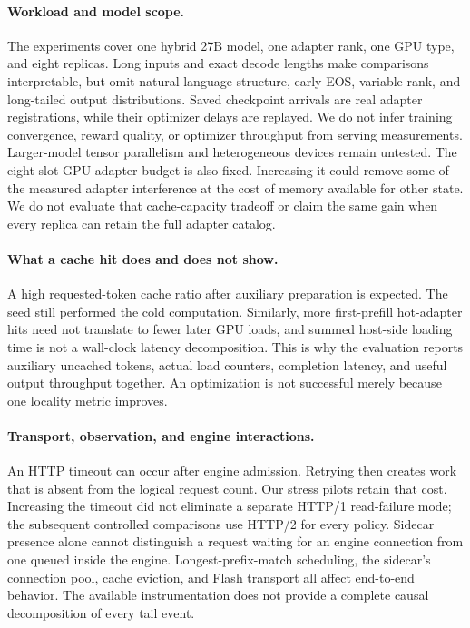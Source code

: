 \paragraph{Workload and model scope.}
The experiments cover one hybrid 27B model, one adapter rank, one GPU type, and
eight replicas. Long inputs and exact decode lengths make comparisons
interpretable, but omit natural language structure, early EOS, variable rank,
and long-tailed output distributions. Saved checkpoint arrivals are real adapter
registrations, while their optimizer delays are replayed. We do not infer
training convergence, reward quality, or optimizer throughput from serving
measurements. Larger-model tensor parallelism and heterogeneous devices remain
untested.
The eight-slot GPU adapter budget is also fixed. Increasing it could remove
some of the measured adapter interference at the cost of memory available for
other state. We do not evaluate that cache-capacity tradeoff or claim the same
gain when every replica can retain the full adapter catalog.

\paragraph{What a cache hit does and does not show.}
A high requested-token cache ratio after auxiliary preparation is expected.
The seed still performed the cold computation. Similarly, more first-prefill
hot-adapter hits need not translate to fewer later GPU loads, and summed
host-side loading time is not a wall-clock latency decomposition. This is why
the evaluation reports auxiliary uncached tokens, actual load counters,
completion latency, and useful output throughput together. An optimization is
not successful merely because one locality metric improves.

\paragraph{Transport, observation, and engine interactions.}
An HTTP timeout can occur after engine admission. Retrying then creates work
that is absent from the logical request count. Our stress pilots retain that
cost. Increasing the timeout did not eliminate a separate HTTP/1 read-failure
mode; the subsequent controlled comparisons use HTTP/2 for every policy.
Sidecar presence alone cannot distinguish a request waiting for an
engine connection from one queued inside the engine. Longest-prefix-match
scheduling, the sidecar's connection pool, cache eviction, and Flash transport
all affect end-to-end behavior. The available instrumentation does not provide a
complete causal decomposition of every tail event.

